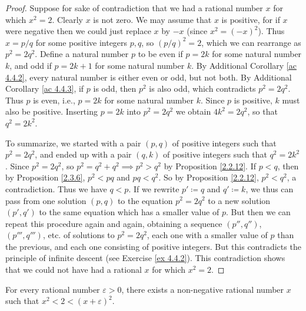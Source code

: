 \begin{proof}
    Suppose for sake of contradiction that we had a rational number \(x\) for which \(x^2 = 2\).
    Clearly \(x\) is not zero.
    We may assume that \(x\) is positive, for if \(x\) were negative then we could just replace \(x\) by \(-x\)
    (since \(x^2 = (-x)^2\)).
    Thus \(x = p / q\) for some positive integers \(p, q\), so \((p / q)^2 = 2\), which we can rearrange as \(p^2 = 2q^2\).
    Define a natural number \(p\) to be even if \(p = 2k\) for some natural number \(k\), and odd if \(p = 2k + 1\) for some natural number \(k\).
    By Additional Corollary \ref{ac 4.4.2}, every natural number is either even or odd, but not both.
    By Additional Corollary \ref{ac 4.4.3}, if \(p\) is odd, then \(p^2\) is also odd, which contradicts \(p^2 = 2q^2\).
    Thus \(p\) is even, i.e., \(p = 2k\) for some natural number \(k\).
    Since \(p\) is positive, \(k\) must also be positive.
    Inserting \(p = 2k\) into \(p^2 = 2q^2\) we obtain \(4k^2 = 2q^2\), so that \(q^2 = 2k^2\).

    To summarize, we started with a pair \((p, q)\) of positive integers such that \(p^2 = 2q^2\), and ended up with a pair \((q, k)\) of positive integers such that \(q^2 = 2k^2\).
    Since \(p^2 = 2q^2\), so \(p^2 = q^2 + q^2 \implies p^2 > q^2\) by Proposition \ref{2.2.12}.
    If \(p < q\), then by Proposition \ref{2.3.6}, \(p^2 < pq\) and \(pq < q^2\).
    So by Proposition \ref{2.2.12}, \(p^2 < q^2\), a contradiction.
    Thus we have \(q < p\).
    If we rewrite \(p' \coloneqq q\) and \(q' \coloneqq k\), we thus can pass from one solution \((p, q)\) to the equation \(p^2 = 2q^2\) to a new solution \((p', q')\) to the same equation which has a smaller value of \(p\).
    But then we can repeat this procedure again and again, obtaining a sequence \((p'', q'')\), \((p''', q''')\), etc. of solutions to \(p^2 = 2q^2\), each one with a smaller value of \(p\) than the previous, and each one consisting of positive integers.
    But this contradicts the principle of infinite descent (see Exercise \ref{ex 4.4.2}).
    This contradiction shows that we could not have had a rational \(x\) for which \(x^2 = 2\).
\end{proof}

\begin{proposition}\label{4.4.5}
    For every rational number \(\varepsilon > 0\), there exists a non-negative rational number \(x\) such that \(x^2 < 2 < (x + \varepsilon)^2\).
\end{proposition}

